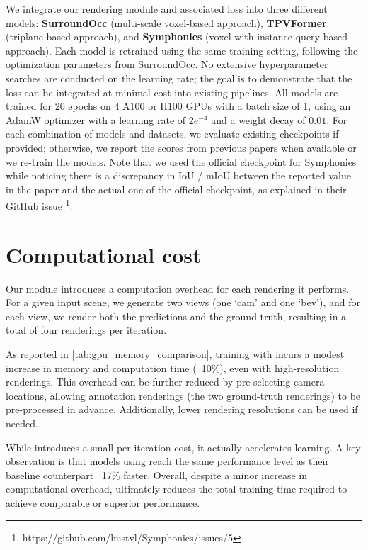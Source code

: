 We integrate our rendering module and associated loss into three different models: \textbf{SurroundOcc} \cite{wei2023surroundocc} (multi-scale voxel-based approach), \textbf{TPVFormer} \cite{huang2023tpv} (triplane-based approach), and \textbf{Symphonies} \cite{jiang2024symphonies} (voxel-with-instance query-based approach).
Each model is retrained using the same training setting, following the optimization parameters from SurroundOcc. No extensive hyperparameter searches are conducted on the learning rate; the goal is to demonstrate that the loss can be integrated at minimal cost into existing pipelines. All models are trained for 20 epochs on 4 A100 or H100 GPUs with a batch size of 1, using an AdamW optimizer with a learning rate of $2e^{-4}$ and a weight decay of $0.01$.
For each combination of models and datasets, we evaluate existing checkpoints if provided; otherwise, we report the scores from previous papers when available or we re-train the models. Note that we used the official checkpoint for Symphonies \cite{jiang2024symphonies} while noticing there is a discrepancy in IoU / mIoU between the reported value in the paper and the actual one of the official checkpoint, as explained in their GitHub issue \footnote{https://github.com/hustvl/Symphonies/issues/5}.


\section{Computational cost}

{Our module introduces a computation overhead for each rendering it performs. For a given input scene, we generate two views (one `cam' and one `bev'), and for each view, we render both the predictions and the ground truth, resulting in a total of four renderings per iteration.
}

{
As reported in \cref{tab:gpu_memory_comparison}, training with \method{} incurs a modest increase in memory and computation time (~10\%), even with high-resolution renderings. This overhead can be further reduced by pre-selecting camera locations, allowing annotation renderings (the two ground-truth renderings) to be pre-processed in advance. Additionally, lower rendering resolutions can be used if needed.
}

{While \method{} introduces a small per-iteration cost, it actually accelerates learning. A key observation is that models using \method{} reach the same performance level as their baseline counterpart ~17\% faster. Overall, despite a minor increase in computational overhead, \method{} ultimately reduces the total training time required to achieve comparable or superior performance.}



